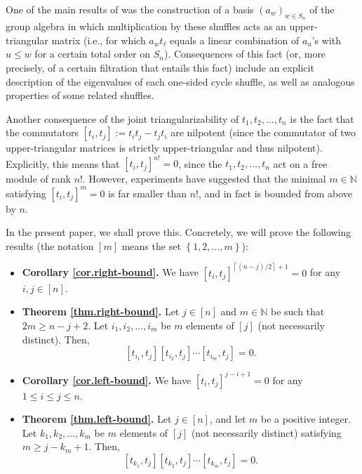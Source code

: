 \documentclass[numbers=enddot,12pt,final,onecolumn,notitlepage]{scrartcl}%
\theoremstyle{definition}
\begin{document}
One of the main results of \cite{s2b1} was the construction of a basis
$\left(  a_{w}\right)  _{w\in S_{n}}$ of the group algebra in which
multiplication by these shuffles acts as an upper-triangular matrix (i.e., for
which $a_{w}t_{\ell}$ equals a linear combination of $a_{u}$'s with $u\leq w$
for a certain total order on $S_{n}$). Consequences of this fact (or, more
precisely, of a certain filtration that entails this fact) include an explicit
description of the eigenvalues of each one-sided cycle shuffle, as well as
analogous properties of some related shuffles.

Another consequence of the joint triangularizability of $t_{1},t_{2}%
,\ldots,t_{n}$ is the fact that the commutators $\left[  t_{i},t_{j}\right]
:=t_{i}t_{j}-t_{j}t_{i}$ are nilpotent (since the commutator of two
upper-triangular matrices is strictly upper-triangular and thus nilpotent).
Explicitly, this means that $\left[  t_{i},t_{j}\right]  ^{n!}=0$, since the
$t_{1},t_{2},\ldots,t_{n}$ act on a free module of rank $n!$. However,
experiments have suggested that the minimal $m\in\mathbb{N}$ satisfying
$\left[  t_{i},t_{j}\right]  ^{m}=0$ is far smaller than $n!$, and in fact is
bounded from above by $n$.

In the present paper, we shall prove this. Concretely, we will prove the
following results (the notation $\left[  m\right]  $ means the set $\left\{
1,2,\ldots,m\right\}  $):

\begin{itemize}
\item \textbf{Corollary \ref{cor.right-bound}.} We have $\left[  t_{i}%
,t_{j}\right]  ^{\left\lceil \left(  n-j\right)  /2\right\rceil +1}=0$ for any
$i,j\in\left[  n\right]  $.

\item \textbf{Theorem \ref{thm.right-bound}.} Let $j\in\left[  n\right]  $ and
$m\in\mathbb{N}$ be such that $2m\geq n-j+2$. Let $i_{1},i_{2},\ldots,i_{m}$
be $m$ elements of $\left[  j\right]  $ (not necessarily distinct). Then,
\[
\left[  t_{i_{1}},t_{j}\right]  \left[  t_{i_{2}},t_{j}\right]  \cdots\left[
t_{i_{m}},t_{j}\right]  =0.
\]


\item \textbf{Corollary \ref{cor.left-bound}.} We have $\left[  t_{i}%
,t_{j}\right]  ^{j-i+1}=0$ for any $1\leq i\leq j\leq n$.

\item \textbf{Theorem \ref{thm.left-bound}.} Let $j\in\left[  n\right]  $, and
let $m$ be a positive integer. Let $k_{1},k_{2},\ldots,k_{m}$ be $m$ elements
of $\left[  j\right]  $ (not necessarily distinct) satisfying $m\geq
j-k_{m}+1$. Then,
\[
\left[  t_{k_{1}},t_{j}\right]  \left[  t_{k_{2}},t_{j}\right]  \cdots\left[
t_{k_{m}},t_{j}\right]  =0.
\]

\end{itemize}
\end{document}
